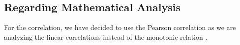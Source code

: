 \documentclass[fontsize=11pt]{article}
\begin{document}
\subsection{Regarding Mathematical Analysis}
For the correlation, we have decided to use the Pearson correlation as we are analyzing the linear correlations instead of the monotonic relation \cite{user3636user3636} \cite{machinelearningmastery}.

\printbibliography

\end{document}
